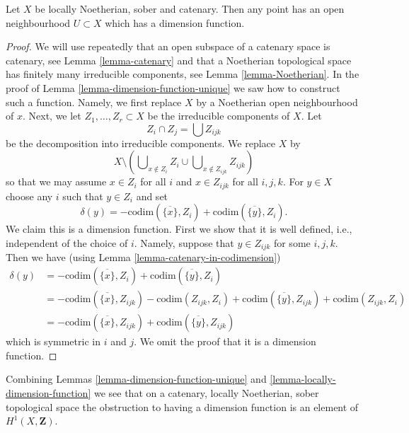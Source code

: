 \begin{lemma}
\label{lemma-locally-dimension-function}
Let $X$ be locally Noetherian, sober and catenary.
Then any point has an open neighbourhood
$U \subset X$ which has a dimension function.
\end{lemma}

\begin{proof}
We will use repeatedly
that an open subspace of a catenary space is catenary, see
Lemma \ref{lemma-catenary} and that a Noetherian topological space
has finitely many irreducible components, see Lemma \ref{lemma-Noetherian}.
In the proof of Lemma \ref{lemma-dimension-function-unique} we saw how to
construct such a function. Namely, we first replace $X$ by a Noetherian
open neighbourhood of $x$. Next, we let $Z_1, \ldots, Z_r \subset X$
be the irreducible components of $X$. Let
$$
Z_i \cap Z_j = \bigcup Z_{ijk}
$$
be the decomposition into irreducible components. We replace
$X$ by
$$
X \setminus \left(
\bigcup\nolimits_{x \not \in Z_i} Z_i
\cup
\bigcup\nolimits_{x \not \in Z_{ijk}} Z_{ijk}
\right)
$$
so that we may assume $x \in Z_i$ for all $i$ and
$x \in Z_{ijk}$ for all $i, j, k$. For $y \in X$ choose any
$i$ such that $y \in Z_i$ and set
$$
\delta(y) = - \text{codim}(\overline{\{x\}}, Z_i) 
+ \text{codim}(\overline{\{y\}}, Z_i).
$$
We claim this is a dimension function. First we show that it
is well defined, i.e., independent of the choice of $i$.
Namely, suppose that $y \in Z_{ijk}$ for some $i, j, k$.
Then we have (using Lemma \ref{lemma-catenary-in-codimension})
\begin{align*}
\delta(y) & =
- \text{codim}(\overline{\{x\}}, Z_i) 
+ \text{codim}(\overline{\{y\}}, Z_i) \\
& =
- \text{codim}(\overline{\{x\}}, Z_{ijk})
- \text{codim}(Z_{ijk}, Z_i)
+ \text{codim}(\overline{\{y\}}, Z_{ijk})
+ \text{codim}(Z_{ijk}, Z_i) \\
& =
- \text{codim}(\overline{\{x\}}, Z_{ijk})
+ \text{codim}(\overline{\{y\}}, Z_{ijk})
\end{align*}
which is symmetric in $i$ and $j$.
We omit the proof that it is a dimension function.
\end{proof}

\begin{remark}
\label{remark-obstruction-to-dimension-function}
Combining Lemmas \ref{lemma-dimension-function-unique} and
\ref{lemma-locally-dimension-function} we see that on a catenary,
locally Noetherian, sober topological space the obstruction to
having a dimension function is an element of
$H^1(X, \mathbf{Z})$.
\end{remark}



